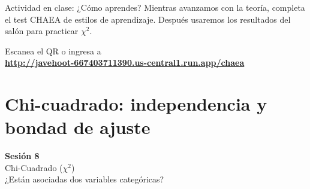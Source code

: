 \documentclass[aspectratio=169, 11pt]{beamer}
\begin{document}
\begin{frame}{Actividad en clase: ¿Cómo aprendes?}
\small
Mientras avanzamos con la teoría, completa el test CHAEA de estilos de aprendizaje. Después usaremos los resultados del salón para practicar $\chi^2$.

\vspace{0.3cm}
\begin{center}
{\Large Escanea el QR o ingresa a}\\[0.5em]
{\large\textbf{\url{http://javehoot-667403711390.us-central1.run.app/chaea}}}\\[0.8em]

\end{center}

\vspace{0.2cm}

\end{frame}



\section{Chi-cuadrado: independencia y bondad de ajuste}

\begin{frame}{}
\vfill
\centering
{\Large\textbf{Sesión 8}}\\[1em]
{\normalsize Chi-Cuadrado ($\chi^2$)}\\[0.5em]
{\small ¿Están asociadas dos variables categóricas?}
\vfill
\end{frame}

\end{document}
